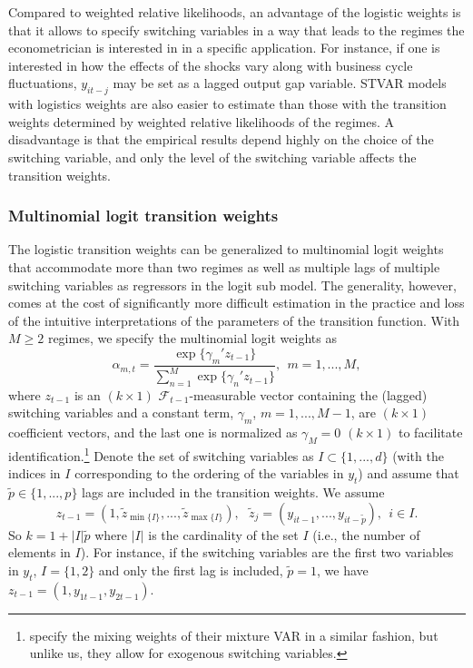 \documentclass[nojss]{jss}
\begin{document}
Compared to weighted relative likelihoods, an advantage of the logistic weights is that it allows to specify switching variables in a way that leads to the regimes the econometrician is interested in in a specific application. For instance, if one is interested in how the effects of the shocks vary along with business cycle fluctuations, $y_{it-j}$ may be set as a lagged output gap variable. STVAR models with logistics weights are also easier to estimate than those with the transition weights determined by weighted relative likelihoods of the regimes. A disadvantage is that the empirical results depend highly on the choice of the switching variable, and only the level of the switching variable affects the transition weights.

\subsubsection{Multinomial logit transition weights}
The logistic transition weights can be generalized to multinomial logit weights that accommodate more than two regimes as well as multiple lags of multiple switching variables as regressors in the logit sub model. The generality, however, comes at the cost of significantly more difficult estimation in the practice and loss of the intuitive interpretations of the parameters of the transition function.  With $M\geq 2$ regimes, we specify the multinomial logit weights as
\begin{equation}\label{eq:logistic_alphas}
\alpha_{m,t} = \frac{\exp\lbrace{\gamma_m'z_{t-1}\rbrace}}{\sum_{n=1}^M \exp\lbrace{\gamma_n'z_{t-1} \rbrace}}, \ \ m=1,...,M,
\end{equation}
where $z_{t-1}$ is an $(k\times 1)$ $\mathcal{F}_{t-1}$-measurable vector containing the (lagged) switching variables and a constant term, $\gamma_m$, $m=1,...,M-1$, are $(k\times 1)$ coefficient vectors, and the last one is normalized as $\gamma_M=0$ $(k\times 1)$ to facilitate identification.\footnote{\cite{Burgard+Neuenkirch+Nockel:2019} specify the mixing weights of their mixture VAR in a similar fashion, but unlike us, they allow for exogenous switching variables.}
Denote the set of switching variables as $I\subset \lbrace 1,...,d \rbrace$ (with the indices in $I$ corresponding to the ordering of the variables in $y_t$) and assume that $\tilde{p} \in \lbrace 1,...,p \rbrace$ lags are included in the transition weights. We assume
\begin{equation}
z_{t-1} = (1, \tilde{z}_{\min\lbrace I\rbrace},...,\tilde{z}_{\max\lbrace I\rbrace}), \ \ \ \tilde{z}_{j} =(y_{it-1},...,y_{it-\tilde{p}}), \ \ i\in I.
\end{equation}
So $k=1+|I|\tilde{p}$ where $|I|$ is the cardinality of the set $I$ (i.e., the number of elements in $I$). For instance, if the switching variables are the first two variables in $y_t$, $I=\lbrace 1,2 \rbrace$ and only the first lag is included, $\tilde{p}=1$, we have $z_{t-1} = (1,y_{1t-1}, y_{2t-1})$.
\end{document}
